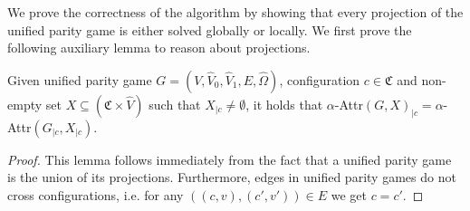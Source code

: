We prove the correctness of the algorithm by showing that every projection of the unified parity game is either solved globally or locally. We first prove the following auxiliary lemma to reason about projections.

\begin{lemma}
	\label{lem_projected_attr_is_attr_of_projected}
	Given unified parity game $G = (V,\hat{V}_0,\hat{V}_1,E,\hat{\Omega})$, configuration $c \in \mathfrak{C}$ and non-empty set $X \subseteq (\mathfrak{C} \times \hat{V})$ such that $X_{|c} \neq \emptyset$, it holds that $\alpha$-Attr$(G,X)_{|c}= \alpha$-Attr$(G_{|c},X_{|c})$.
	\begin{proof}
		This lemma follows immediately from the fact that a unified parity game is the union of its projections. Furthermore, edges in unified parity games do not cross configurations, i.e. for any $((c,v),(c',v')) \in E$ we get $c = c'$.
	\end{proof}
\end{lemma}

